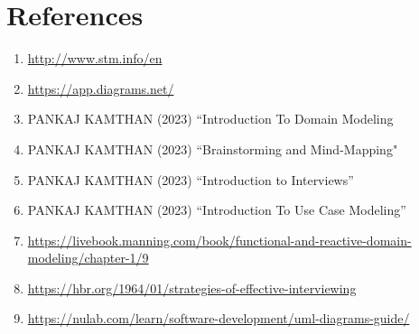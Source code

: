 \documentclass[a4paper,12pt]{report}
\begin{document}
\chapter{References}
\begin{enumerate}
  \item \url{http://www.stm.info/en}
   \item \url{https://app.diagrams.net/}
  \item PANKAJ KAMTHAN (2023) “Introduction To Domain Modeling
   \item PANKAJ KAMTHAN (2023) “Brainstorming and Mind-Mapping"
   \item PANKAJ KAMTHAN (2023) “Introduction to Interviews”
   \item PANKAJ KAMTHAN (2023) “Introduction To Use Case Modeling”
   
   \item \url{https://livebook.manning.com/book/functional-and-reactive-domain-modeling/chapter-1/9}
   \item \url{https://hbr.org/1964/01/strategies-of-effective-interviewing}
   \item \url{https://nulab.com/learn/software-development/uml-diagrams-guide/}
   

   
\end{enumerate}

 
\end{document}
